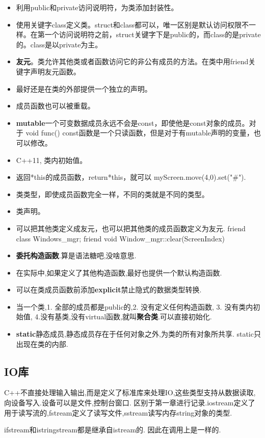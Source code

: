 \begin{itemize}
	\item 利用public和private访问说明符，为类添加封装性。
	\item 使用关键字class定义类。struct和class都可以，唯一区别是默认访问权限不一样。在第一个访问说明符之前，struct关键字下是public的，而class的是private的。class是以private为主。
	\item \textbf{友元}。类允许其他类或者函数访问它的非公有成员的方法。在类中用friend关键字声明友元函数。
	\item 最好还是在类的外部提供一个独立的声明。
	\item 成员函数也可以被重载。
	\item \textbf{mutable}一个可变数据成员永远不会是const，即使他是const对象的成员。对于 void func() const{}函数是一个只读函数，但是对于有mutable声明的变量，也可以修改。
	\item C++11, 类内初始值。
	\item 返回*this的成员函数，return*this，就可以 myScreen.move(4,0).set("#").
	\item 类类型，即使成员函数完全一样，不同的类就是不同的类型。
	\item 类声明。
	\item 可以把其他类定义成友元，也可以把其他类的成员函数定义为友元. friend class Windows\_mgr; friend void Window\_mgr::clear(ScreenIndex)
	\item \textbf{委托构造函数}.算是语法糖吧,没啥意思.
	\item 在实际中,如果定义了其他构造函数,最好也提供一个默认构造函数.
	\item 可以在类成员函数前添加\textbf{explicit}禁止隐式的数据类型转换.
	\item 当一个类,1. 全部的成员都是public的,2. 没有定义任何构造函数, 3. 没有类内初始值, 4.没有基类,没有virtual函数,就叫\textbf{聚合类}.可以直接初始化.
	\item \textbf{static}静态成员,静态成员存在于任何对象之外,为类的所有对象所共享. static只出现在类的内部.
\end{itemize}

\subsection{IO库}
C++不直接处理输入输出,而是定义了标准库来处理IO,这些类型支持从数据读取,向设备写入.设备可以是文件,控制台窗口.
区别于第一章进行记录.iostream定义了用于读写流的,fstream定义了读写文件,sstream读写内存string对象的类型.

ifstream和istringstream都是继承自istream的. 因此在调用上是一样的.

